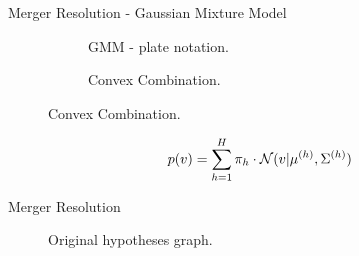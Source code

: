
\begin{frame}{Merger Resolution - Gaussian Mixture Model}
    \begin{figure}
        \centering
        \begin{subfigure}[b]{0.44\textwidth}
            \centering
            \scalebox{0.74}{
                
            }
            \caption{GMM - plate notation.}
        \end{subfigure}
        \hfill
        \begin{subfigure}[b]{0.44\textwidth}
            \centering
            \scalebox{0.65}{
                
            }
            \caption{Convex Combination.}
        \end{subfigure}
        \label{fig:conservation-gmm}
    \end{figure}
    \begin{align*}
        p(v) = \sum_{h=1}^H\pi_h\cdot\mathcal{N}({v}|\mathbf{\mu }^{(h)} , {\Sigma }^{(h)} )
    \end{align*}
\end{frame}

\begin{frame}{Merger Resolution}
    \begin{figure}
        \centering
        \scalebox{0.7}{
            \begin{tikzpicture}[minimum size=58pt,scale=0.45, every node/.style={scale=0.45, font=\LARGE}, thick]
                
            \end{tikzpicture}
        }
        \caption{Original hypotheses graph.}
        \label{fig:conservation-hyp-inferred}
    \end{figure}
\end{frame}

